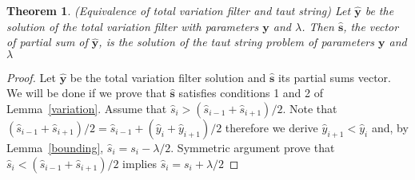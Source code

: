 \documentclass{article}
\newtheorem{theorem}{Theorem}[section]
\theoremstyle{definition}
\def\*#1{\mathbf{#1}}
\begin{document}
\begin{theorem}{(Equivalence of total variation filter and taut string)}
  Let $\hat{\*y}$ be the solution of the total variation filter with parameters $\*y$ and $\lambda$. Then $\hat{\*s}$, the vector of partial sum of $\hat{\*y}$, is the solution of the taut string problem of parameters $\*y$ and $\lambda$
\end{theorem}
\begin{proof}
  Let $\hat{\*y}$ be the total variation filter solution and $\hat{\*s}$ its partial sums vector.
  We will be done if we prove that $\hat{\*s}$ satisfies conditions 1 and 2 of Lemma~\ref{variation}.
  Assume that $\hat{s}_i > (\hat{s}_{i-1} + \hat{s}_{i + 1})/2$. Note that $(\hat{s}_{i-1} + \hat{s}_{i + 1})/2 = \hat{s}_{i-1} + (\hat{y}_i + \hat{y}_{i+1})/2$ therefore we derive $\hat{y}_{i+1} < \hat{y}_i$ and, by Lemma~\ref{bounding}, $\hat{s}_{i} = s_i - \lambda/2$. Symmetric argument prove that $\hat{s}_i < (\hat{s}_{i-1} + \hat{s}_{i + 1})/2$ implies $\hat{s}_{i} = s_i + \lambda/2$
\end{proof}
  
\end{document}
